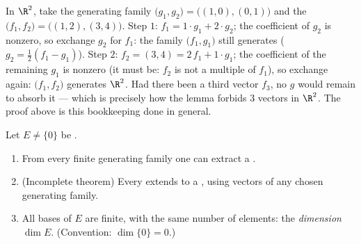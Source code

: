 \begin{example}
\label{ex:b1:findim:exchangerun}
In $\R^2$, take the generating family $\bigl(g_1, g_2\bigr) =
\bigl((1,0), (0,1)\bigr)$ and the  $\bigl(f_1,
f_2\bigr) = \bigl((1,2), (3,4)\bigr)$. Step $1$: $f_1 = 1\cdot
g_1 + 2\cdot g_2$; the coefficient of $g_2$ is nonzero, so
exchange $g_2$ for $f_1$: the family $\bigl(f_1, g_1\bigr)$
still generates ($g_2 = \frac12(f_1 - g_1)$). Step $2$: $f_2 =
(3,4) = 2\,f_1 + 1\cdot g_1$; the coefficient of the remaining
$g_1$ is nonzero (it must be: $f_2$ is not a multiple of $f_1$),
so exchange again: $\bigl(f_1, f_2\bigr)$ generates $\R^2$. Had
there been a third  vector $f_3$, no $g$ would remain to
absorb it --- which is precisely how the lemma forbids $3$ 
vectors in $\R^2$. The proof above is this bookkeeping done in
general.
\end{example}

\begin{theorem}\label{thm:b1:findim:bases}
Let $E \neq \{0\}$ be .
\begin{enumerate}
  \item From every finite generating family one can extract a .
  \item (Incomplete  theorem)
        Every  extends to a , using vectors of any
        chosen generating family.
  \item All bases of $E$ are finite, with the same number of
        elements: the \emph{dimension} $\dim E$. (Convention:
        $\dim\{0\} = 0$.)
\end{enumerate}
\end{theorem}

